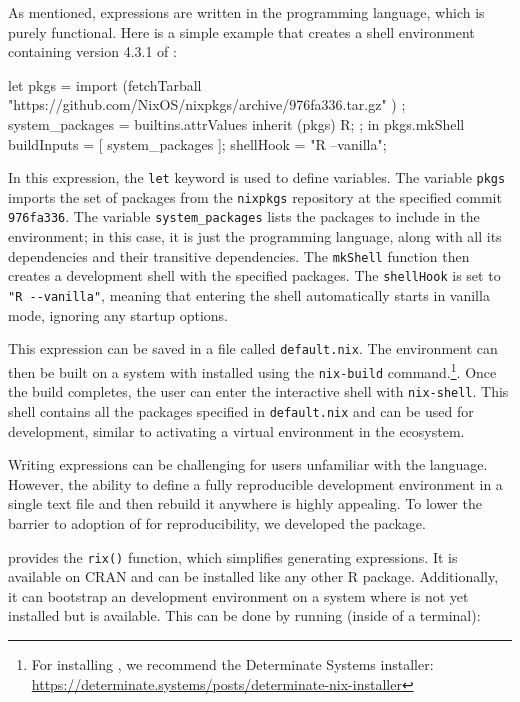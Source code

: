 \documentclass[
  article]{jss}
\begin{document}
As mentioned,  expressions are written in the 
programming language, which is purely functional. Here is a simple
example that creates a shell environment containing version 4.3.1 of
:

\begin{CodeInput}
let
  pkgs = import (fetchTarball
    "https://github.com/NixOS/nixpkgs/archive/976fa336.tar.gz"
  ) {};
  system_packages = builtins.attrValues {
    inherit (pkgs) R;
  };
in
  pkgs.mkShell {
    buildInputs = [ system_packages ];
    shellHook = "R --vanilla";
  }
\end{CodeInput}

In this expression, the \texttt{let} keyword is used to define
variables. The variable \texttt{pkgs} imports the set of packages from
the \texttt{nixpkgs} repository at the specified commit
\texttt{976fa336}. The variable \texttt{system\_packages} lists the
packages to include in the environment; in this case, it is just the
 programming language, along with all its dependencies and
their transitive dependencies. The \texttt{mkShell} function then
creates a development shell with the specified packages. The
\texttt{shellHook} is set to \texttt{"R\ -\/-vanilla"}, meaning that
entering the shell automatically starts  in vanilla mode,
ignoring any startup options.

This expression can be saved in a file called \texttt{default.nix}. The
environment can then be built on a system with  installed using
the \texttt{nix-build} command.\footnote{For installing , we
  recommend the Determinate Systems installer:
  \url{https://determinate.systems/posts/determinate-nix-installer}}.
Once the build completes, the user can enter the interactive shell with
\texttt{nix-shell}. This shell contains all the packages specified in
\texttt{default.nix} and can be used for development, similar to
activating a virtual environment in the  ecosystem.

Writing  expressions can be challenging for users unfamiliar
with the  language. However, the ability to define a fully
reproducible development environment in a single text file and then
rebuild it anywhere is highly appealing. To lower the barrier to
adoption of  for reproducibility, we developed the 
package.

 provides the \texttt{rix()} function, which simplifies
generating  expressions. It is available on CRAN and can be
installed like any other R package. Additionally, it can bootstrap an
 development environment on a system where  is
not yet installed but  is available. This can be done by
running (inside of a terminal):
\end{document}
